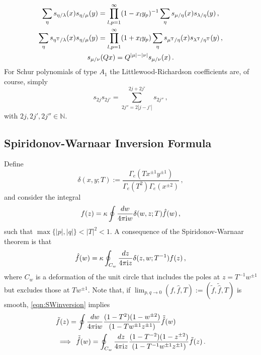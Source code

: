 \documentclass[main.tex]{subfiles}
\begin{document}
\begin{gather}
\sum_{\eta}s_{\eta/\lambda}(x)s_{\eta/\mu}(y)=\prod_{l,p=1}^{\infty}(1-x_ly_p)^{-1}\sum_{\eta}s_{\mu/\eta}(x)s_{\lambda/\eta}(y)\,,\label{eqn:skew1}\\
\sum_{\eta}s_{\eta^{\operatorname{T}}/\lambda}(x)s_{\eta/\mu}(y)=\prod_{l,p=1}^{\infty}(1+x_ly_p)\sum_{\eta}s_{\mu^{\operatorname{T}}/\eta}(x)s_{\lambda^{\operatorname{T}}/\eta^{\operatorname{T}}}(y)\,,\label{eqn:skew2}\\
s_{\mu/\nu}(Qx)=Q^{|\mu|-|\nu|}s_{\mu/\nu}(x)\label{eqn:skew3}\,.
\end{gather}
For Schur polynomials of type $A_1$ the Littlewood-Richardson coefficients are, of course, simply
\begin{equation}
s_{2j}s_{2j'}=\sum_{2j''=2|j-j'|}^{2j+2j'}s_{2j''}\,,
\end{equation}
with $2j,2j',2j''\in\mathbb{N}$.

\subsection{Spiridonov-Warnaar Inversion Formula}
Define
\begin{equation}\label{eqn:deltafac}
\delta(x,y;T):=\frac{\Gamma_e(Tx^{\pm1}y^{\pm1})}{\Gamma_e(T^2)\Gamma_e(x^{\pm2})}\,,
\end{equation}
and consider the integral
\begin{equation}
f(z)=\kappa\oint\frac{dw}{4\pi\mathrm{i} w}\delta(w,z;T)\hat{f}(w)\,,
\end{equation}
such that $\max\{|p|,|q|\}<|T|^2<1$. A consequence of the Spiridonov-Warnaar theorem is that \cite{2004math11044S,Gadde:2010te}
\begin{equation}\label{eqn:SWinversion}
\hat{f}(w)=\kappa\oint_{C_w}\frac{dz}{4\pi\mathrm{i} z}\delta(z,w;T^{-1})f(z)\,,
\end{equation}
where $C_w$ is a deformation of the unit circle that includes the poles at $z=T^{-1}w^{\pm1}$ but excludes those at $Tw^{\pm1}$. Note that, if $\lim_{p,q\to0}(f,\hat{f},T):=(\tilde{f},\tilde{\hat{f}},T)$ is smooth, \eqref{eqn:SWinversion} implies
\begin{equation}
\begin{aligned}
&\tilde{f}(z)=\oint\frac{dw}{4\pi\mathrm{i} w}\frac{(1-T^2)(1-w^{\pm2})}{(1-Tw^{\pm1}z^{\pm1})}\tilde{\hat{f}}(w) \\
&\implies\,
\tilde{\hat{f}}(w)=\oint_{C_w}\frac{dz}{4\pi\mathrm{i} z}\frac{(1-T^{-2})(1-z^{\pm2})}{(1-T^{-1}w^{\pm1}z^{\pm1})}\tilde{f}(z)\,.
\end{aligned}
\end{equation}
\end{document}
